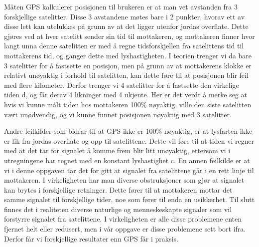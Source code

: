 \vspace{5mm}

Måten GPS kalkulerer posisjonen til brukeren er at man vet avstanden fra 3 forskjellige satelitter. Disse 3 avstandene møtes bare i 2 punkter, hvorav ett av disse lett kan utelukkes på grunn av at det ligger utenfor jordas overflate. Dette gjøres ved at hver satelitt sender sin tid til mottakeren, og mottakeren finner hvor langt unna denne satelitten er med å regne tidsforskjellen fra satelittens tid til mottakerens tid, og ganger dette med lyshastigheten. I teorien trenger vi da bare 3 satelitter for å fastsette en posisjon, men på grunn av at mottakerens klokke er relativt unøyaktig i forhold til satelitten, kan dette føre til at posisjonen blir feil med flere kilometer. Derfor trenger vi 4 satelitter for å fastsette den virkelige tiden d, og får derav 4 likninger med 4 ukjente. Her er det verdt å merke seg at hvis vi kunne målt tiden hos mottakeren 100\% nøyaktig, ville den siste satelitten vært unødvendig, og vi kunne funnet posisjonen nøyaktig med 3 satelitter. 

\vspace{5mm}

Andre feilkilder som bidrar til at GPS ikke er 100\% nøyaktig, er at lysfarten ikke er lik fra jordas overflate og opp til satelittene. Dette vil føre til at tiden vi regner med at det tar for signalet å komme frem blir litt unøyaktig, ettersom vi i utregningene har regnet med en konstant lyshastighet c. En annen feilkilde er at vi i denne oppgaven tar det for gitt at signalet fra satelittene går i en rett linje til mottakeren. I virkeligheten har man diverse obstruksjoner som gjør at signalet kan brytes i forskjellige retninger. Dette fører til at mottakeren mottar det samme signalet til forskjellige tider, noe som fører til enda en usikkerhet. Til slutt finnes det i realiteten diverse naturlige og menneskeskapte signaler som vil forstyrre signalet fra satelittene. I virkeligheten er alle disse problemene enten fjernet helt eller redusert, men i vår oppgave er disse problemene sett bort ifra. Derfor får vi forskjellige resultater enn GPS får i praksis. 